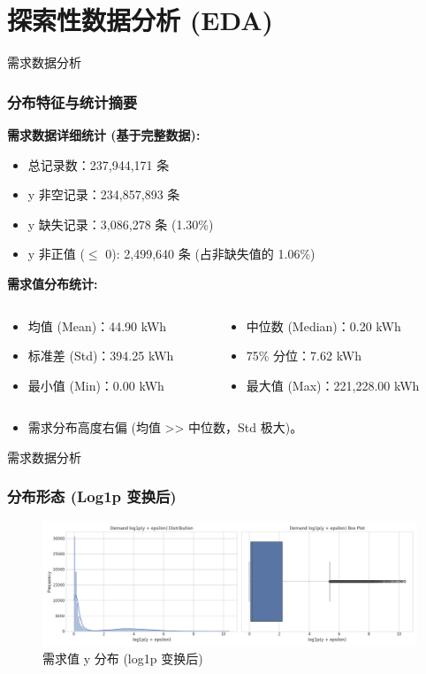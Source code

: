 \documentclass{beamer} %
\begin{document}
\section{探索性数据分析 (EDA)}

\begin{frame}{需求数据分析}
    \frametitle{分布特征与统计摘要}
    \textbf{需求数据详细统计 (基于完整数据):}
    \begin{itemize}
        \item 总记录数：237,944,171 条
        \item y 非空记录：234,857,893 条
        \item y 缺失记录：3,086,278 条 (1.30\%)
        \item y 非正值 ($\leq$ 0): 2,499,640 条 (占非缺失值的 1.06\%)
    \end{itemize}

    \textbf{需求值分布统计:}
    \begin{columns}
        \begin{column}{0.48\textwidth}
            \begin{itemize}
                \item 均值 (Mean)：44.90 kWh
                \item 标准差 (Std)：394.25 kWh
                \item 最小值 (Min)：0.00 kWh
            \end{itemize}
        \end{column}
        \begin{column}{0.48\textwidth}
            \begin{itemize}
                \item 中位数 (Median)：0.20 kWh
                \item 75\% 分位：7.62 kWh
                \item 最大值 (Max)：221,228.00 kWh
            \end{itemize}
        \end{column}
    \end{columns}
    \begin{itemize}
        \item 需求分布高度右偏 (均值 >> 中位数，Std 极大)。
    \end{itemize}
\end{frame}

\begin{frame}{需求数据分析}
    \frametitle{分布形态 (Log1p 变换后)}
    \begin{figure}[H]
        \centering
        \includegraphics[width=\textwidth]{../plots/demand_y_distribution_log1p_scale.png}
        \caption{需求值 y 分布 (log1p 变换后)}
    \end{figure}
\end{frame}
\end{document}
